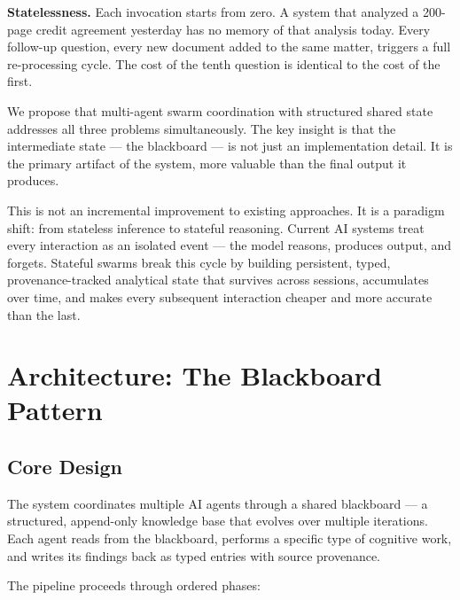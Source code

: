 \documentclass[11pt,a4paper]{article}
\begin{document}
\textbf{Statelessness.} Each invocation starts from zero. A system that analyzed a 200-page credit agreement yesterday has no memory of that analysis today. Every follow-up question, every new document added to the same matter, triggers a full re-processing cycle. The cost of the tenth question is identical to the cost of the first.

We propose that multi-agent swarm coordination with structured shared state addresses all three problems simultaneously. The key insight is that the intermediate state — the blackboard — is not just an implementation detail. It is the primary artifact of the system, more valuable than the final output it produces.

This is not an incremental improvement to existing approaches. It is a paradigm shift: from stateless inference to stateful reasoning. Current AI systems treat every interaction as an isolated event — the model reasons, produces output, and forgets. Stateful swarms break this cycle by building persistent, typed, provenance-tracked analytical state that survives across sessions, accumulates over time, and makes every subsequent interaction cheaper and more accurate than the last.


\section{Architecture: The Blackboard Pattern}

\subsection{Core Design}

The system coordinates multiple AI agents through a shared blackboard — a structured, append-only knowledge base that evolves over multiple iterations. Each agent reads from the blackboard, performs a specific type of cognitive work, and writes its findings back as typed entries with source provenance.

The pipeline proceeds through ordered phases:
\end{document}
